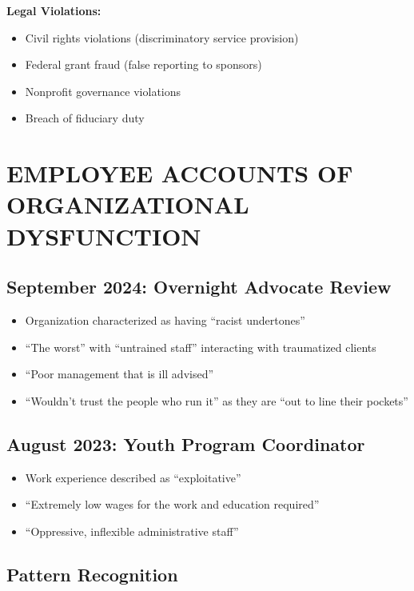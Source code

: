 \documentclass[12pt,oneside]{article}
\begin{document}
\textbf{Legal Violations:}
\begin{itemize}
\item Civil rights violations (discriminatory service provision)
\item Federal grant fraud (false reporting to sponsors)
\item Nonprofit governance violations
\item Breach of fiduciary duty
\end{itemize}

\newpage

\section*{EMPLOYEE ACCOUNTS OF ORGANIZATIONAL DYSFUNCTION}

\subsection*{September 2024: Overnight Advocate Review}

\begin{itemize}
\item Organization characterized as having ``racist undertones''
\item ``The worst'' with ``untrained staff'' interacting with traumatized clients
\item ``Poor management that is ill advised''
\item ``Wouldn't trust the people who run it'' as they are ``out to line their pockets''
\end{itemize}

\subsection*{August 2023: Youth Program Coordinator}

\begin{itemize}
\item Work experience described as ``exploitative''
\item ``Extremely low wages for the work and education required''
\item ``Oppressive, inflexible administrative staff''
\end{itemize}

\subsection*{Pattern Recognition}
\end{document}
